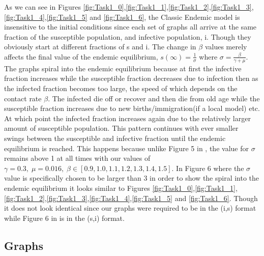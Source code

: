 \documentclass[11pt,a4paper]{CLabBookTemplate} %
\begin{document}
As we can see in Figures \ref{fig:Task1_0},\ref{fig:Task1_1},\ref{fig:Task1_2},\ref{fig:Task1_3},\ref{fig:Task1_4},\ref{fig:Task1_5} and \ref{fig:Task1_6}, the Classic Endemic model is insensitive to the initial conditions since each set of graphs all arrive at the same fraction of the susceptible population, and infective population, i. Though they obviously start at different fractions of s and i. The change in $\beta$ values merely affects the final value of the endemic equilibrium, $s(\infty) = \frac{1}{\sigma}$ where $\sigma = \frac{\beta}{\gamma + \mu}$. The graphs spiral into the endemic equilibrium because at first the infective fraction increases while the susceptible fraction decreases due to infection then as the infected fraction becomes too large, the speed of which depends on the contact rate $\beta$. The infected die off or recover and then die from old age while the susceptible fraction increases due to new births/immigration(if a local model) etc. At which point the infected fraction increases again due to the relatively larger amount of susceptible population. This pattern continues with ever smaller swings between the susceptible and infective fraction until the endemic equilibrium is reached. This happens because unlike Figure 5 in \cite{Heth}, the value for $\sigma$ remains above 1 at all times with our values of $\gamma = 0.3,\; \mu = 0.016, \;\beta \in [0.9,1.0,1.1,1.2,1.3,1.4,1.5]$. In Figure 6 where \cite{Heth} the $\sigma$ value is specifically chosen to be larger than 3 in order to show the spiral into the endemic equilibrium it looks similar to Figures \ref{fig:Task1_0},\ref{fig:Task1_1},\ref{fig:Task1_2},\ref{fig:Task1_3},\ref{fig:Task1_4},\ref{fig:Task1_5} and \ref{fig:Task1_6}. Though it does not look identical since our graphs were required to be in the (i,s) format while Figure 6 in \cite{Heth} is in the (s,i) format.


\newpage
\subsection{Graphs}
\end{document}
